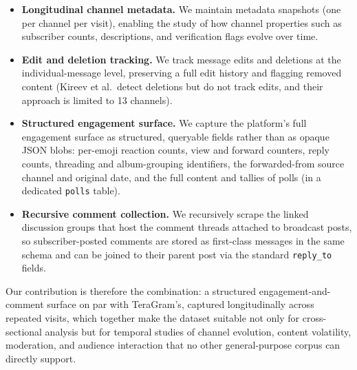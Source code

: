 \begin{itemize}
  \item \textbf{Longitudinal channel metadata.} We maintain metadata snapshots (one per channel per visit), enabling the study of how channel properties such as subscriber counts, descriptions, and verification flags evolve over time.
  \item \textbf{Edit and deletion tracking.} We track message edits and deletions at the individual-message level, preserving a full edit history and flagging removed content (Kireev et al.\ detect deletions but do not track edits, and their approach is limited to 13 channels).
  \item \textbf{Structured engagement surface.} We capture the platform's full engagement surface as structured, queryable fields rather than as opaque JSON blobs: per-emoji reaction counts, view and forward counters, reply counts, threading and album-grouping identifiers, the forwarded-from source channel and original date, and the full content and tallies of polls (in a dedicated \texttt{polls} table).
  \item \textbf{Recursive comment collection.} We recursively scrape the linked discussion groups that host the comment threads attached to broadcast posts, so subscriber-posted comments are stored as first-class messages in the same schema and can be joined to their parent post via the standard \texttt{reply\_to} fields.
\end{itemize}

Our contribution is therefore the combination: a structured engagement-and-comment surface on par with TeraGram's, captured longitudinally across repeated visits, which together make the dataset suitable not only for cross-sectional analysis but for temporal studies of channel evolution, content volatility, moderation, and audience interaction that no other general-purpose corpus can directly support.

